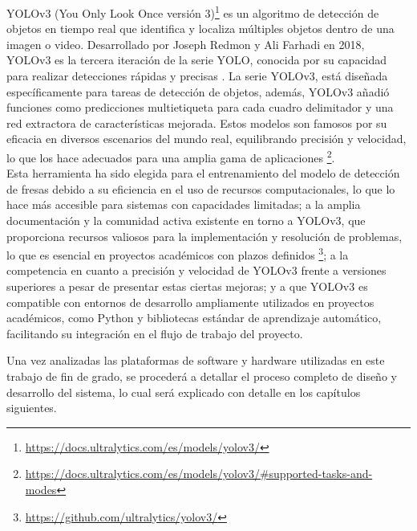 YOLOv3 (You Only Look Once versión 3)\footnote{\url{https://docs.ultralytics.com/es/models/yolov3/}} es un algoritmo de detección de objetos en tiempo real que identifica y localiza múltiples objetos dentro de una imagen o video. Desarrollado por Joseph Redmon y Ali Farhadi en 2018, YOLOv3 es la tercera iteración de la serie YOLO, conocida por su capacidad para realizar detecciones rápidas y precisas \cite{Redmon18}. %
La serie YOLOv3, está diseñada específicamente para tareas de detección de objetos, además, YOLOv3 añadió funciones como predicciones multietiqueta para cada cuadro delimitador y una red extractora de características mejorada. Estos modelos son famosos por su eficacia en diversos escenarios del mundo real, equilibrando precisión y velocidad, lo que los hace adecuados para una amplia gama de aplicaciones \footnote{\url{https://docs.ultralytics.com/es/models/yolov3/\#supported-tasks-and-modes}}.\\

Esta herramienta ha sido elegida para el entrenamiento del modelo de detección de fresas debido a su eficiencia en el uso de recursos computacionales, lo que lo hace más accesible para sistemas con capacidades limitadas; a la amplia documentación y la comunidad activa existente en torno a YOLOv3, que proporciona recursos valiosos para la implementación y resolución de problemas, lo que es esencial en proyectos académicos con plazos definidos \footnote{\url{https://github.com/ultralytics/yolov3/}}; a la competencia en cuanto a precisión y velocidad de YOLOv3 frente a versiones superiores a pesar de presentar estas ciertas mejoras; y a que YOLOv3 es compatible con entornos de desarrollo ampliamente utilizados en proyectos académicos, como Python y bibliotecas estándar de aprendizaje automático, facilitando su integración en el flujo de trabajo del proyecto.

\vspace{20mm}

Una vez analizadas las plataformas de software y hardware utilizadas en este trabajo de fin de grado, se procederá a detallar el proceso completo de diseño y desarrollo del sistema, lo cual será explicado con detalle en los capítulos siguientes.






